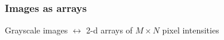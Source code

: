 \begin{frame}
  \frametitle{Images as arrays}

  \begin{center}
    Grayscale images $\leftrightarrow$ 2-d arrays of $M \times N$ pixel intensities
    \vskip20pt
  \end{center}

\end{frame}

